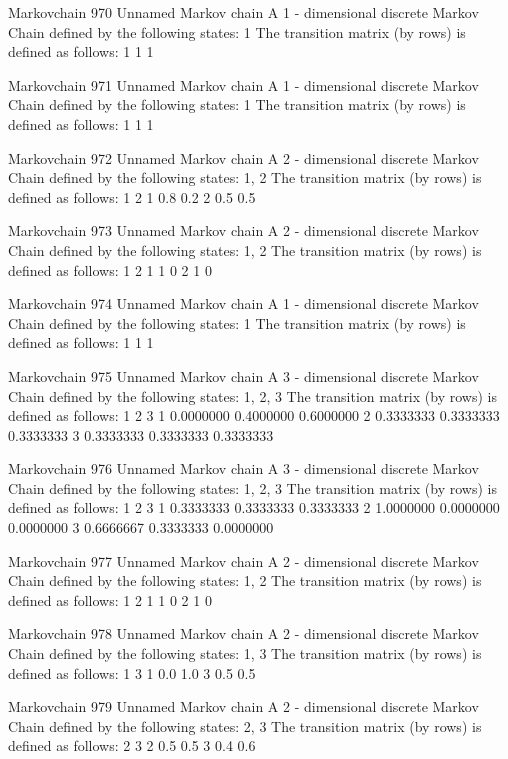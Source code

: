 \documentclass[
  nojss]{jss}
\begin{document}
\begin{CodeChunk}
\begin{CodeOutput}
Markovchain  970 
Unnamed Markov chain 
 A  1 - dimensional discrete Markov Chain defined by the following states: 
 1 
 The transition matrix  (by rows)  is defined as follows: 
  1
1 1

Markovchain  971 
Unnamed Markov chain 
 A  1 - dimensional discrete Markov Chain defined by the following states: 
 1 
 The transition matrix  (by rows)  is defined as follows: 
  1
1 1

Markovchain  972 
Unnamed Markov chain 
 A  2 - dimensional discrete Markov Chain defined by the following states: 
 1, 2 
 The transition matrix  (by rows)  is defined as follows: 
    1   2
1 0.8 0.2
2 0.5 0.5

Markovchain  973 
Unnamed Markov chain 
 A  2 - dimensional discrete Markov Chain defined by the following states: 
 1, 2 
 The transition matrix  (by rows)  is defined as follows: 
  1 2
1 1 0
2 1 0

Markovchain  974 
Unnamed Markov chain 
 A  1 - dimensional discrete Markov Chain defined by the following states: 
 1 
 The transition matrix  (by rows)  is defined as follows: 
  1
1 1

Markovchain  975 
Unnamed Markov chain 
 A  3 - dimensional discrete Markov Chain defined by the following states: 
 1, 2, 3 
 The transition matrix  (by rows)  is defined as follows: 
          1         2         3
1 0.0000000 0.4000000 0.6000000
2 0.3333333 0.3333333 0.3333333
3 0.3333333 0.3333333 0.3333333

Markovchain  976 
Unnamed Markov chain 
 A  3 - dimensional discrete Markov Chain defined by the following states: 
 1, 2, 3 
 The transition matrix  (by rows)  is defined as follows: 
          1         2         3
1 0.3333333 0.3333333 0.3333333
2 1.0000000 0.0000000 0.0000000
3 0.6666667 0.3333333 0.0000000

Markovchain  977 
Unnamed Markov chain 
 A  2 - dimensional discrete Markov Chain defined by the following states: 
 1, 2 
 The transition matrix  (by rows)  is defined as follows: 
  1 2
1 1 0
2 1 0

Markovchain  978 
Unnamed Markov chain 
 A  2 - dimensional discrete Markov Chain defined by the following states: 
 1, 3 
 The transition matrix  (by rows)  is defined as follows: 
    1   3
1 0.0 1.0
3 0.5 0.5

Markovchain  979 
Unnamed Markov chain 
 A  2 - dimensional discrete Markov Chain defined by the following states: 
 2, 3 
 The transition matrix  (by rows)  is defined as follows: 
    2   3
2 0.5 0.5
3 0.4 0.6


\end{CodeOutput}
\end{CodeChunk}
\end{document}
